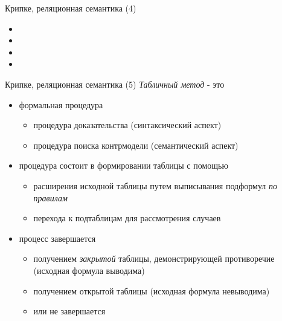 \documentclass{beamer}
\begin{document}
\begin{frame}{Крипке, реляционная семантика (4)}
\begin{itemize}
  \item 
  \item 
  \item 
  \item 
\end{itemize}
\end{frame}

\begin{frame}{Крипке, реляционная семантика (5)}
\textit{Табличный метод} - это \\
\bigskip
\begin{itemize}
  \item формальная процедура
    \begin{itemize}
      \item процедура доказательства (синтаксический аспект)
      \item процедура поиска контрмодели (семантический аспект)
    \end{itemize}
  \item процедура состоит в формировании таблицы с помощью 
    \begin{itemize}
      \item расширения исходной таблицы путем выписывания подформул \textit{по правилам}
      \item перехода к подтаблицам для рассмотрения случаев
    \end{itemize}  
  \item процесс завершается 
    \begin{itemize}
      \item получением \textit{закрытой} таблицы, демонстрирующей противоречие (исходная формула выводима)
      \item получением открытой таблицы (исходная формула невыводима)
      \item или не завершается
    \end{itemize}
\end{itemize}
\end{frame}
\end{document}
